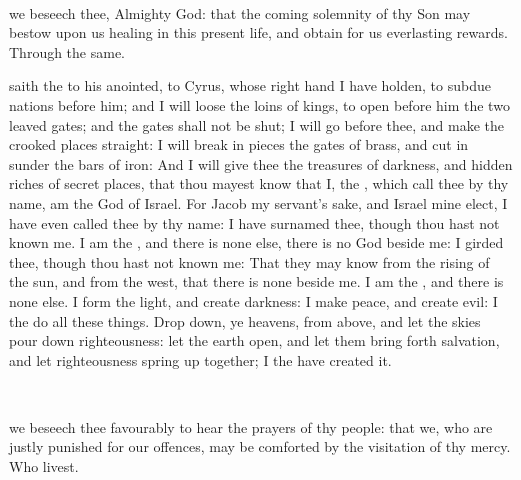 \\


\collect
{} we beseech thee, Almighty God: that the coming solemnity of thy Son may bestow upon us healing in this present life, and obtain for us everlasting rewards. Through the same.

 saith the  to his anointed, to Cyrus, whose right hand I have holden, to subdue nations before him; and I will loose the loins of kings, to open before him the two leaved gates; and the gates shall not be shut; I will go before thee, and make the crooked places straight: I will break in pieces the gates of brass, and cut in sunder the bars of iron: And I will give thee the treasures of darkness, and hidden riches of secret places, that thou mayest know that I, the , which call thee by thy name, am the God of Israel. For Jacob my servant's sake, and Israel mine elect, I have even called thee by thy name: I have surnamed thee, though thou hast not known me. I am the , and there is none else, there is no God beside me: I girded thee, though thou hast not known me: That they may know from the rising of the sun, and from the west, that there is none beside me. I am the , and there is none else. I form the light, and create darkness: I make peace, and create evil: I the  do all these things. Drop down, ye heavens, from above, and let the skies pour down righteousness: let the earth open, and let them bring forth salvation, and let righteousness spring up together; I the  have created it.

\\

\collect
{} we beseech thee favourably to hear the prayers of thy people: that we, who are justly punished for our offences, may be comforted by the visitation of thy mercy. Who livest.

